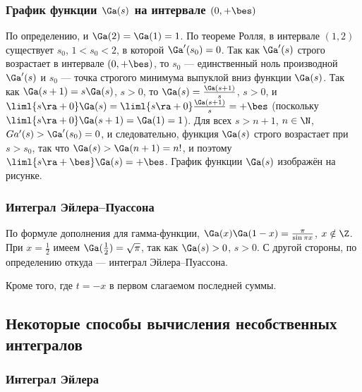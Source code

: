 \documentclass[a4paper]{article}
\begin{document}
\subsubsection{График функции $\Ga(s)$ на интервале $(0,+\bes)$}

По определению,  и
$\Ga(2)=\Ga(1)=1$. По теореме Ролля, в интервале $(1,2)$ существует
$s_0$, $1<s_0<2$, в которой $\Ga'(s_0)=0$. Так как $\Ga'(s)$ строго
возрастает в интервале $(0,+\bes)$, то $s_0$ --- единственный ноль
производной $\Ga'(s)$ и $s_0$ --- точка строгого минимума выпуклой
вниз функции $\Ga(s)$. Так как $\Ga(s+1) = s\Ga(s)$, $s>0$, то
$\Ga(s) = \frac{\Ga(s+1)}s$, $s>0$, и $\liml{s\ra +0} \Ga(s) =
\liml{s\ra +0} \frac{\Ga(s+1)}s=+\bes$ (поскольку $\liml{s\ra+0}
\Ga(s+1)= \Ga(1) = 1$). Для всех $s>n+1$, $n\in\N$,
$Ga'(s)>\Ga'(s_0)=0$, и следовательно, функция $\Ga(s)$ строго
возрастает при $s>s_0$, так что $\Ga(s) > \Ga(n+1)=n!$, и поэтому
$\liml{s\ra+\bes} \Ga(s) = +\bes$. График функции $\Ga(s)$ изображён
на рисунке.

\subsubsection{Интеграл Эйлера--Пуассона}

По формуле дополнения для гамма-функции, $\Ga(x)\Ga(1-x) =
\frac{\pi}{\sin\pi x}$, $x\notin \Z$. При $x=\frac12$ имеем
$\Ga(\frac12) = \sqrt{\pi}$, так как $\Ga(s)>0$, $s>0$. С другой
стороны, по определению  откуда  --- интеграл Эйлера--Пуассона.

Кроме того,  где $t=-x$
в первом слагаемом последней суммы.

\subsection{Некоторые способы вычисления несобственных интегралов}
\subsubsection{Интеграл Эйлера}
\end{document}
